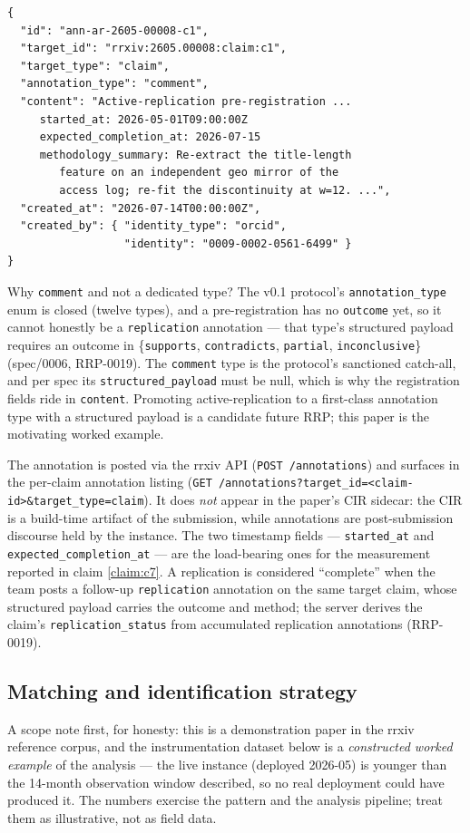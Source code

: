\documentclass{rrxiv}
\begin{document}
\begin{verbatim}
{
  "id": "ann-ar-2605-00008-c1",
  "target_id": "rrxiv:2605.00008:claim:c1",
  "target_type": "claim",
  "annotation_type": "comment",
  "content": "Active-replication pre-registration ...
     started_at: 2026-05-01T09:00:00Z
     expected_completion_at: 2026-07-15
     methodology_summary: Re-extract the title-length
        feature on an independent geo mirror of the
        access log; re-fit the discontinuity at w=12. ...",
  "created_at": "2026-07-14T00:00:00Z",
  "created_by": { "identity_type": "orcid",
                  "identity": "0009-0002-0561-6499" }
}
\end{verbatim}

Why \texttt{comment} and not a dedicated type? The v0.1 protocol's \texttt{annotation\_type} enum is closed (twelve types), and a pre-registration has no \texttt{outcome} yet, so it cannot honestly be a \texttt{replication} annotation --- that type's structured payload requires an outcome in \{\texttt{supports}, \texttt{contradicts}, \texttt{partial}, \texttt{inconclusive}\} (spec/0006, RRP-0019). The \texttt{comment} type is the protocol's sanctioned catch-all, and per spec its \texttt{structured\_payload} must be null, which is why the registration fields ride in \texttt{content}. Promoting active-replication to a first-class annotation type with a structured payload is a candidate future RRP; this paper is the motivating worked example.

The annotation is posted via the rrxiv API (\texttt{POST /annotations}) and surfaces in the per-claim annotation listing (\texttt{GET /annotations?target\_id=<claim-id>\&target\_type=claim}). It does \emph{not} appear in the paper's CIR sidecar: the CIR is a build-time artifact of the submission, while annotations are post-submission discourse held by the instance. The two timestamp fields --- \texttt{started\_at} and \texttt{expected\_completion\_at} --- are the load-bearing ones for the measurement reported in claim \ref{claim:c7}. A replication is considered ``complete'' when the team posts a follow-up \texttt{replication} annotation on the same target claim, whose structured payload carries the outcome and method; the server derives the claim's \texttt{replication\_status} from accumulated replication annotations (RRP-0019).

\subsection{Matching and identification strategy}
A scope note first, for honesty: this is a demonstration paper in the rrxiv reference corpus, and the instrumentation dataset below is a \emph{constructed worked example} of the analysis --- the live instance (deployed 2026-05) is younger than the 14-month observation window described, so no real deployment could have produced it. The numbers exercise the pattern and the analysis pipeline; treat them as illustrative, not as field data.
\end{document}
